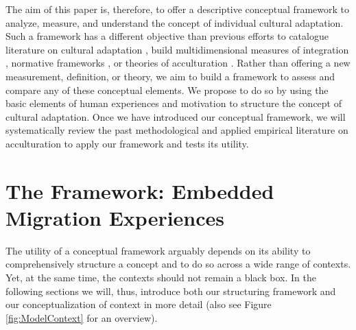 \documentclass[man, 12pt, a4paper]{apa7}
\begin{document}
The aim of this paper is, therefore, to offer a descriptive conceptual framework to analyze, measure, and understand the concept of individual cultural adaptation. Such a framework has a different objective than previous efforts to catalogue literature on cultural adaptation \citep[e.g.,][]{Castels2003}, build multidimensional measures of integration \citep[e.g.,][]{Harder2018}, normative frameworks \citep[e.g.,][]{Ager2008a}, or theories of acculturation \citep[e.g.,][]{Berry2005}. Rather than offering a new measurement, definition, or theory, we aim to build a framework to assess and compare any of these conceptual elements. 
We propose to do so by using the basic elements of human experiences and motivation to structure the concept of cultural adaptation.
Once we have introduced our conceptual framework, we will systematically review the past methodological and applied empirical literature on acculturation to apply our framework and tests its utility. \\

\section{The Framework: Embedded Migration Experiences}
The utility of a conceptual framework arguably depends on its ability to comprehensively structure a concept and to do so across a wide range of contexts. Yet, at the same time, the contexts should not remain a black box. In the following sections we will, thus, introduce both our structuring framework and our conceptualization of context in more detail (also see Figure \ref{fig:ModelContext} for an overview).
\end{document}
